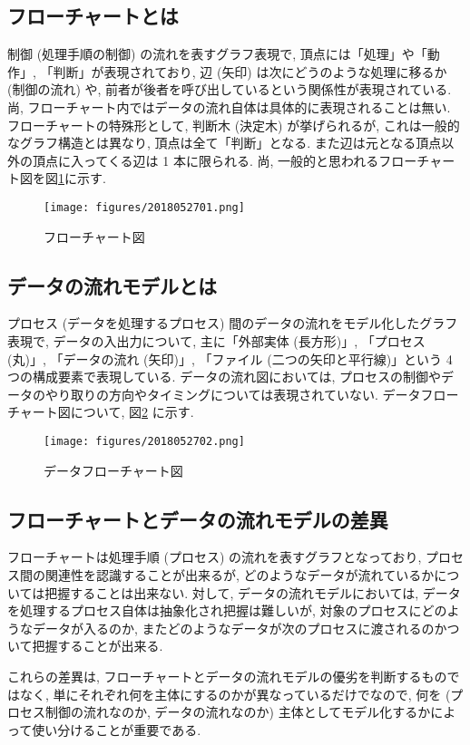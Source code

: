 \documentclass[a4paper]{jsarticle}
\begin{document}
\subsection{フローチャートとは}

制御 (処理手順の制御) の流れを表すグラフ表現で, 頂点には「処理」や「動作」, 「判断」が表現されており, 辺 (矢印) は次にどうのような処理に移るか (制御の流れ) や, 前者が後者を呼び出しているという関係性が表現されている. 尚, フローチャート内ではデータの流れ自体は具体的に表現されることは無い. フローチャートの特殊形として, 判断木 (決定木) が挙げられるが, これは一般的なグラフ構造とは異なり, 頂点は全て「判断」となる. また辺は元となる頂点以外の頂点に入ってくる辺は 1 本に限られる. 尚, 一般的と思われるフローチャート図を図\ref{fig:flowchart}に示す.

\begin{figure}[htbp]
  \begin{center}
    \texttt{[image: figures/2018052701.png]}
    \caption{フローチャート図}
    \label{fig:flowchart}
  \end{center}
\end{figure}

\subsection{データの流れモデルとは}

プロセス (データを処理するプロセス) 間のデータの流れをモデル化したグラフ表現で, データの入出力について, 主に「外部実体 (長方形)」, 「プロセス (丸)」, 「データの流れ (矢印)」, 「ファイル (二つの矢印と平行線)」という 4 つの構成要素で表現している. データの流れ図においては, プロセスの制御やデータのやり取りの方向やタイミングについては表現されていない. データフローチャート図について, 図\ref{fig:dataflowchart} に示す.

\begin{figure}[htbp]
  \begin{center}
    \texttt{[image: figures/2018052702.png]}
    \caption{データフローチャート図}
    \label{fig:dataflowchart}
  \end{center}
\end{figure}

\subsection{フローチャートとデータの流れモデルの差異}

フローチャートは処理手順 (プロセス) の流れを表すグラフとなっており, プロセス間の関連性を認識することが出来るが, どのようなデータが流れているかについては把握することは出来ない. 対して, データの流れモデルにおいては, データを処理するプロセス自体は抽象化され把握は難しいが, 対象のプロセスにどのようなデータが入るのか, またどのようなデータが次のプロセスに渡されるのかついて把握することが出来る.

これらの差異は, フローチャートとデータの流れモデルの優劣を判断するものではなく, 単にそれぞれ何を主体にするのかが異なっているだけでなので, 何を (プロセス制御の流れなのか, データの流れなのか) 主体としてモデル化するかによって使い分けることが重要である.
\end{document}
